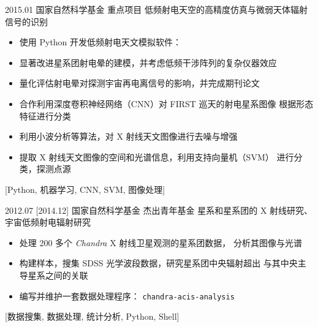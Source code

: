 \documentclass[zh]{resume}
\begin{document}
\begin{projects}
  \project
    {2015.01}%
    {国家自然科学基金}%
    {重点项目}%
    {低频射电天空的高精度仿真与微弱天体辐射信号的识别}%
    {\begin{itemize}
      \item 使用 Python 开发低频射电天文模拟软件：
      \item 显著改进星系团射电晕的建模，并考虑低频干涉阵列的复杂仪器效应
      \item 量化评估射电晕对探测宇宙再电离信号的影响，并完成期刊论文
      \item 合作利用深度卷积神经网络（CNN）对 FIRST 巡天的射电星系图像
            根据形态特征进行分类
      \item 利用小波分析等算法，对 X 射线天文图像进行去噪与增强
      \item 提取 X 射线天文图像的空间和光谱信息，利用支持向量机（SVM）
            进行分类，探测点源
    \end{itemize}}%
    [Python, 机器学习, CNN, SVM, 图像处理]

  \separator{0.7em}
  \project
    {2012.07}%
    [2014.12]%
    {国家自然科学基金}%
    {杰出青年基金}%
    {星系和星系团的 X 射线研究、宇宙低频射电辐射研究}%
    {\begin{itemize}
      \item 处理 200 多个 \textit{Chandra} X 射线卫星观测的星系团数据，
            分析其图像与光谱
      \item 构建样本，搜集 SDSS 光学波段数据，研究星系团中央辐射超出
            与其中央主导星系之间的关联
      \item 编写并维护一套数据处理程序：
              {\texttt{chandra-acis-analysis}}
    \end{itemize}}%
    [数据搜集, 数据处理, 统计分析, Python, Shell]
\end{projects}
\end{document}
